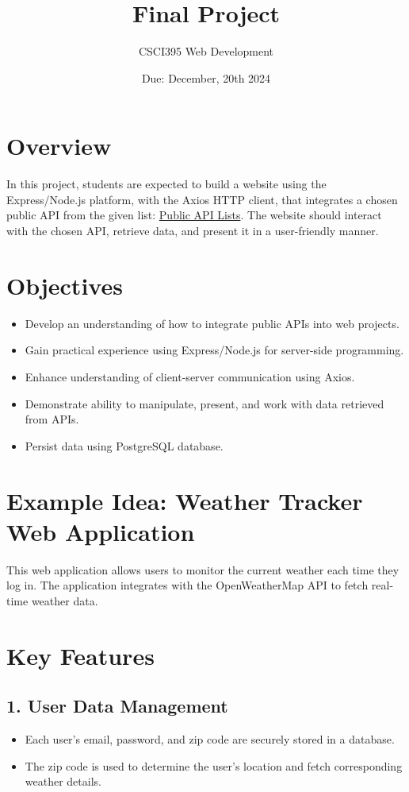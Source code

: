 \documentclass{article}
\title{Final Project}
\author{CSCI395 Web Development}
\date{Due: December, 20th 2024}
\begin{document}
\maketitle


\section{Overview}
In this project, students are expected to build a website using the\\
Express/Node.js platform, with the Axios HTTP client, that integrates a chosen\\
public API from the given list: \href{https://github.com/public-api-lists/public-api-lists}{Public API Lists}.
The website should interact with the chosen API, retrieve data, and present it in a user-friendly manner.


\section{Objectives}
\begin{itemize}
  \item Develop an understanding of how to integrate public APIs into web projects.
  \item Gain practical experience using Express/Node.js for server-side programming.
  \item Enhance understanding of client-server communication using Axios.
  \item Demonstrate ability to manipulate, present, and work with data retrieved from APIs.
  \item Persist data using PostgreSQL database.
\end{itemize}


\section{Example Idea: Weather Tracker Web Application}

This web application allows users to monitor the current weather each time they log in. The application integrates with the OpenWeatherMap API to fetch real-time weather data.

\section*{Key Features}

\subsection*{1. User Data Management}
\begin{itemize}
    \item Each user’s email, password, and zip code are securely stored in a database.
    \item The zip code is used to determine the user’s location and fetch corresponding weather details.
\end{itemize}
\end{document}
